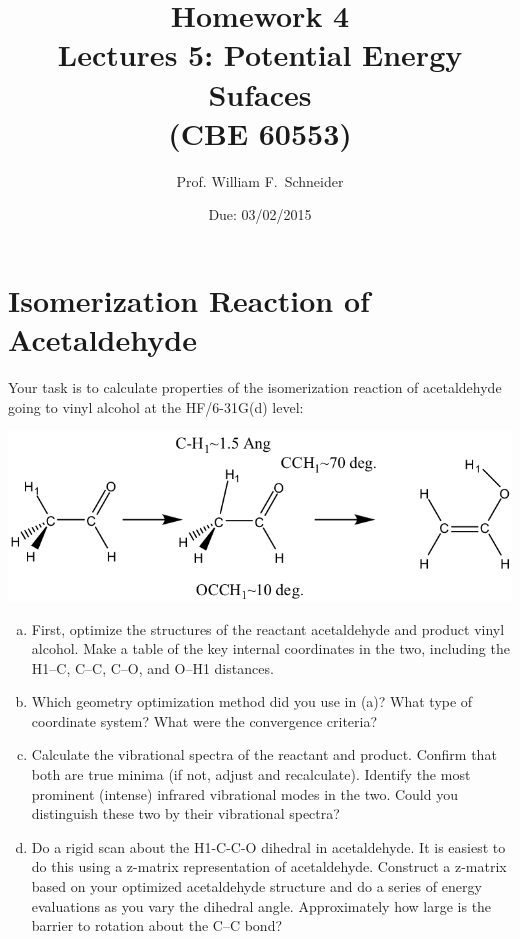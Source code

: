 \documentclass[11pt]{article}
\date{Due: 03/02/2015}
\title{}
\begin{document}
\title{Homework 4\\Lectures 5: Potential Energy Sufaces\\(CBE 60553)}
\author{Prof. William F.\ Schneider}
\maketitle


\section{Isomerization Reaction of Acetaldehyde}
\label{sec-1}

Your task is to calculate properties of the isomerization reaction of acetaldehyde going to vinyl alcohol at the HF/6-31G(d) level:

\begin{center}
\includegraphics[width=.9\linewidth]{fig1.png}
\end{center}


\begin{enumerate}[(a)]
\item First, optimize the structures of the reactant acetaldehyde and product vinyl alcohol. Make a table of the key internal coordinates in the two, including the H1–C, C–C, C–O, and O–H1 distances.

\item Which geometry optimization method did you use in (a)? What type of coordinate system? What were the convergence criteria?

\item Calculate the vibrational spectra of the reactant and product. Confirm that both are true minima (if not, adjust and recalculate). Identify the most prominent (intense) infrared vibrational modes in the two. Could you distinguish these two by their vibrational spectra?

\item Do a rigid scan about the H1-C-C-O dihedral in acetaldehyde. It is easiest to do this using a z-matrix representation of acetaldehyde. Construct a z-matrix based on your optimized acetaldehyde structure and do a series of energy evaluations as you vary the dihedral angle. Approximately how large is the barrier to rotation about the C–C bond?
\end{enumerate}
\end{document}

